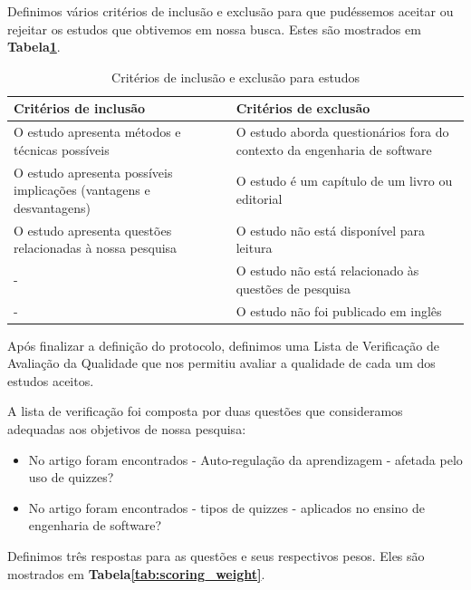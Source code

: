 Definimos vários critérios de inclusão e exclusão para que pudéssemos aceitar ou rejeitar os estudos que obtivemos em nossa busca. Estes são mostrados em \textbf{Tabela\ref{tab:criteria}}.

\begin{table}[ht]
    \centering
        \caption{Critérios de inclusão e exclusão para estudos}
        \begin{tabular}{p{65mm}|p{65mm}}
            \hline
                \textbf{Critérios de inclusão} & \textbf{Critérios de exclusão} \\
            \hline
            \hline
                O estudo apresenta métodos e técnicas possíveis & O estudo aborda questionários fora do contexto da engenharia de software 
                \\
            \hline
                O estudo apresenta possíveis implicações (vantagens e desvantagens)  &
                O estudo é um capítulo de um livro ou editorial \\
            \hline
                O estudo apresenta questões relacionadas à nossa pesquisa  &
                O estudo não está disponível para leitura \\
            \hline
                 - &
                O estudo não está relacionado às questões de pesquisa \\
            \hline
                 - &
                O estudo não foi publicado em inglês \\
            \hline
        \end{tabular}
    \label{tab:criteria}
\end{table}

Após finalizar a definição do protocolo, definimos uma Lista de Verificação de Avaliação da Qualidade que nos permitiu avaliar a qualidade de cada um dos estudos aceitos.

A lista de verificação foi composta por duas questões que consideramos adequadas aos objetivos de nossa pesquisa:

\begin {itemize}
     \item No artigo foram encontrados - Auto-regulação da aprendizagem - afetada pelo uso de quizzes?
     \item No artigo foram encontrados - tipos de quizzes - aplicados no ensino de engenharia de software?
\end{itemize}

Definimos três respostas para as questões e seus respectivos pesos. Eles são mostrados em \textbf {Tabela\ref{tab:scoring_weight}}.


